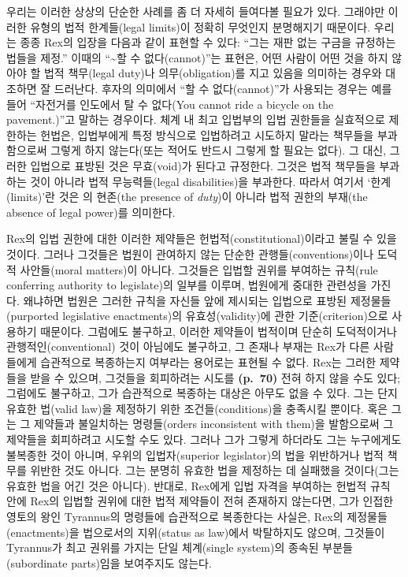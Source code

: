 우리는 이러한 상상의 단순한 사례를 좀 더 자세히 들여다볼 필요가 있다.
그래야만 이러한 유형의 법적 한계들(legal limits)이 정확히 무엇인지
분명해지기 때문이다. 우리는 종종 Rex의 입장을 다음과 같이 표현할 수
있다: “그는 재판 없는 구금을 규정하는 법들을 제정.” 이때의 “\textasciitilde 할 수 없다(cannot)”는 표현은,
어떤 사람이 어떤 것을 하지 않아야 할 법적 책무(legal duty)나
의무(obligation)를 지고 있음을 의미하는 경우와 대조하면 잘 드러난다.
후자의 의미에서 “할 수 없다(cannot)”가 사용되는 경우는 예를 들어
“자전거를 인도에서 탈 수 없다(You cannot ride a bicycle on the
pavement.)”고 말하는 경우이다. 체계 내 최고 입법부의 입법 권한들을
실효적으로 제한하는 헌법은, 입법부에게 특정 방식으로 입법하려고 시도하지
말라는 책무들을 부과함으로써 그렇게 하지 않는다(또는 적어도 반드시
그렇게 할 필요는 없다). 그 대신, 그러한 입법으로 표방된 것은
무효(void)가 된다고 규정한다. 그것은 법적 책무들을 부과하는 것이 아니라
법적 무능력들(legal disabilities)을 부과한다. 따라서 여기서
‘한계(limits)’란 것은 의 현존(the presence of \emph{duty})이
아니라 법적 권한의 부재(the absence of legal power)를 의미한다.

Rex의 입법 권한에 대한 이러한 제약들은 헌법적(constitutional)이라고 불릴
수 있을 것이다. 그러나 그것들은 법원이 관여하지 않는 단순한
관행들(conventions)이나 도덕적 사안들(moral matters)이 아니다. 그것들은
입법할 권위를 부여하는 규칙(rule conferring authority to legislate)의
일부를 이루며, 법원에게 중대한 관련성을 가진다. 왜냐하면 법원은 그러한
규칙을 자신들 앞에 제시되는 입법으로 표방된 제정물들(purported
legislative enactments)의 유효성(validity)에 관한 기준(criterion)으로
사용하기 때문이다. 그럼에도 불구하고, 이러한 제약들이 법적이며 단순히
도덕적이거나 관행적인(conventional) 것이 아님에도 불구하고, 그 존재나
부재는 Rex가 다른 사람들에게 습관적으로 복종하는지 여부라는 용어로는
표현될 수 없다. Rex는 그러한 제약들을 받을 수 있으며, 그것들을
회피하려는 시도를 \textbf{(p.~70)} 전혀 하지 않을 수도 있다; 그럼에도
불구하고, 그가 습관적으로 복종하는 대상은 아무도 없을 수 있다. 그는 단지
유효한 법(valid law)을 제정하기 위한 조건들(conditions)을 충족시킬
뿐이다. 혹은 그는 그 제약들과 불일치하는 명령들(orders inconsistent with
them)을 발함으로써 그 제약들을 회피하려고 시도할 수도 있다. 그러나 그가
그렇게 하더라도 그는 누구에게도 불복종한 것이 아니며, 우위의
입법자(superior legislator)의 법을 위반하거나 법적 책무를 위반한 것도
아니다. 그는 분명히 유효한 법을 제정하는 데 실패했을 것이다(그는 유효한
법을 어긴 것은 아니다). 반대로, Rex에게 입법 자격을 부여하는 헌법적 규칙
안에 Rex의 입법할 권위에 대한 법적 제약들이 전혀 존재하지 않는다면, 그가
인접한 영토의 왕인 Tyrannus의 명령들에 습관적으로 복종한다는 사실은,
Rex의 제정물들(enactments)을 법으로서의 지위(status as law)에서
박탈하지도 않으며, 그것들이 Tyrannus가 최고 권위를 가지는 단일
체계(single system)의 종속된 부분들(subordinate parts)임을 보여주지도
않는다.

